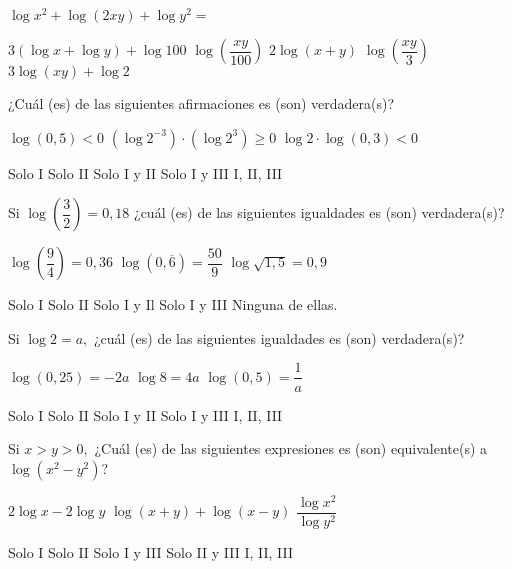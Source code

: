 \documentclass[pagina vacia]{srs}
\begin{document}
\begin{preguntas}
\pregunta $\log x^{2}+\log\left(2xy\right)+\log y^{2}=$
\begin{vertical}
\alternativa $3\left(\log x+\log y\right)+\log 100$
\alternativa $\log\left(\dfrac{xy}{100}\right)$
\alternativa $2 \log\left(x+y\right)$
\alternativa $\log\left(\dfrac{xy}{3}\right)$
\alternativa $3 \log\left(xy\right)+\log 2$
\end{vertical}

\pregunta ¿Cuál (es) de las siguientes afirmaciones es (son) verdadera(s)?
\begin{verticali}
\alternativa $\log\left(0,5\right)<0$
\alternativa $\left(\log 2^{-3}\right)\cdot\left(\log 2^{3}\right)\ge0$
\alternativa $\log 2\cdot \log\left(0,3\right)<0$
\end{verticali}
\begin{vertical}
\alternativa Solo I
\alternativa Solo II
\alternativa Solo I y II
\alternativa Solo I y III
\alternativa I, II, III
\end{vertical}

\pregunta Si $\log\left(\dfrac{3}{2}\right)=0,18$ ¿cuál (es) de las siguientes igualdades es (son) verdadera(s)?
\begin{verticali}
\alternativa $\log\left(\dfrac{9}{4}\right)=0,36$
\alternativa $\log\left(0,\overline{6}\right)=\dfrac{50}{9}$
\alternativa $\log\sqrt{1,5}=0,9$
\end{verticali}
\begin{vertical}
\alternativa Solo I
\alternativa Solo II
\alternativa Solo I y Il
\alternativa Solo I y III
\alternativa Ninguna de ellas.
\end{vertical}

\pregunta Si $\log 2=a,$ ¿cuál (es) de las siguientes igualdades es (son) verdadera(s)?
\begin{verticali}
\alternativa $\log\left(0,25\right)=-2a$
\alternativa $\log 8=4a$
\alternativa $\log\left(0,5\right)=\dfrac{1}{a}$
\end{verticali}
\begin{vertical}
\alternativa Solo I
\alternativa Solo II
\alternativa Solo I y II
\alternativa Solo I y III
\alternativa I, II, III
\end{vertical}

\pregunta Si $x>y>0,$ ¿Cuál (es) de las siguientes expresiones es (son) equivalente(s) a $\log\left(x^{2}-y^{2}\right)$?
\begin{verticali}
\alternativa $2 \log x-2 \log y$
\alternativa $\log\left(x+y\right)+\log\left(x-y\right)$
\alternativa $\dfrac{\log x^{2}}{\log y^{2}}$
\end{verticali}
\begin{vertical}
\alternativa Solo I
\alternativa Solo II
\alternativa Solo I y III
\alternativa Solo II y III
\alternativa I, II, III
\end{vertical}


\end{preguntas}
\end{document}
